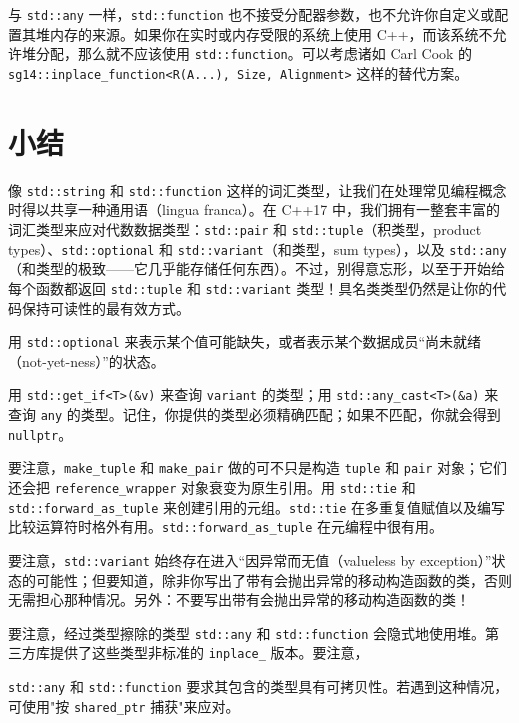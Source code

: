 与 \texttt{std::\allowbreak{}any} 一样，\texttt{std::\allowbreak{}function} 也不接受分配器参数，也不允许你自定义或配置其堆内存的来源。如果你在实时或内存受限的系统上使用 C++，而该系统不允许堆分配，那么就不应该使用 \texttt{std::\allowbreak{}function}。可以考虑诸如 Carl Cook 的 \texttt{sg14::\allowbreak{}inplace\_\allowbreak{}function<\allowbreak{}R(\allowbreak{}A...)\allowbreak{},\allowbreak{} Size,\allowbreak{} Alignment>\allowbreak{}} 这样的替代方案。

\section{小结}

像 \texttt{std::\allowbreak{}string} 和 \texttt{std::\allowbreak{}function} 这样的词汇类型，让我们在处理常见编程概念时得以共享一种通用语（lingua franca）。在 C++17 中，我们拥有一整套丰富的词汇类型来应对代数数据类型：\texttt{std::\allowbreak{}pair} 和 \texttt{std::\allowbreak{}tuple}（积类型，product types）、\texttt{std::\allowbreak{}optional} 和 \texttt{std::\allowbreak{}variant}（和类型，sum types），以及 \texttt{std::\allowbreak{}any}（和类型的极致——它几乎能存储任何东西）。不过，别得意忘形，以至于开始给每个函数都返回 \texttt{std::\allowbreak{}tuple} 和 \texttt{std::\allowbreak{}variant} 类型！具名类类型仍然是让你的代码保持可读性的最有效方式。

用 \texttt{std::\allowbreak{}optional} 来表示某个值可能缺失，或者表示某个数据成员“尚未就绪（not-yet-ness）”的状态。

用 \texttt{std::\allowbreak{}get\_\allowbreak{}if<\allowbreak{}T>\allowbreak{}(\allowbreak{}\&v)\allowbreak{}} 来查询 \texttt{variant} 的类型；用 \texttt{std::\allowbreak{}any\_\allowbreak{}cast<\allowbreak{}T>\allowbreak{}(\allowbreak{}\&a)\allowbreak{}} 来查询 \texttt{any} 的类型。记住，你提供的类型必须精确匹配；如果不匹配，你就会得到 \texttt{nullptr}。

要注意，\texttt{make\_\allowbreak{}tuple} 和 \texttt{make\_\allowbreak{}pair} 做的可不只是构造 \texttt{tuple} 和 \texttt{pair} 对象；它们还会把 \texttt{reference\_\allowbreak{}wrapper} 对象衰变为原生引用。用 \texttt{std::\allowbreak{}tie} 和 \texttt{std::\allowbreak{}forward\_\allowbreak{}as\_\allowbreak{}tuple} 来创建引用的元组。\texttt{std::\allowbreak{}tie} 在多重复值赋值以及编写比较运算符时格外有用。\texttt{std::\allowbreak{}forward\_\allowbreak{}as\_\allowbreak{}tuple} 在元编程中很有用。

要注意，\texttt{std::\allowbreak{}variant} 始终存在进入“因异常而无值（valueless by exception）”状态的可能性；但要知道，除非你写出了带有会抛出异常的移动构造函数的类，否则无需担心那种情况。另外：不要写出带有会抛出异常的移动构造函数的类！

要注意，经过类型擦除的类型 \texttt{std::\allowbreak{}any} 和 \texttt{std::\allowbreak{}function} 会隐式地使用堆。第三方库提供了这些类型非标准的 \texttt{inplace\_\allowbreak{}} 版本。要注意，

\texttt{std::\allowbreak{}any} 和 \texttt{std::\allowbreak{}function} 要求其包含的类型具有可拷贝性。若遇到这种情况，可使用"按 \texttt{shared\_\allowbreak{}ptr} 捕获"来应对。
